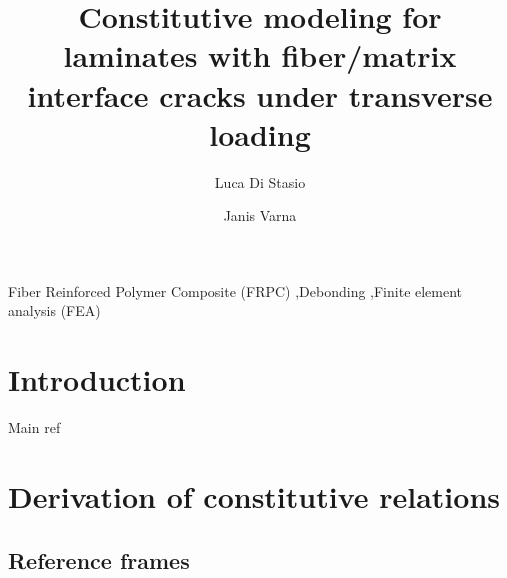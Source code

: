\documentclass[review]{elsarticle}
\begin{document}
\begin{frontmatter}

\title{Constitutive modeling for laminates with fiber/matrix interface cracks under transverse loading}


\author[lulea]{Luca Di Stasio}
\author[lulea]{Janis Varna}


\address[lulea]{Lule\aa\ University of Technology, University Campus, SE-97187 Lule\aa, Sweden}


\begin{abstract}

\end{abstract}

\begin{keyword}
Fiber Reinforced Polymer Composite (FRPC) \sep Debonding \sep Finite element analysis (FEA)
\end{keyword}

\end{frontmatter}

\linenumbers

\section{Introduction}

Main ref~\cite{Varna2018}

\section{Derivation of constitutive relations}

\subsection{Reference frames}
\end{document}

